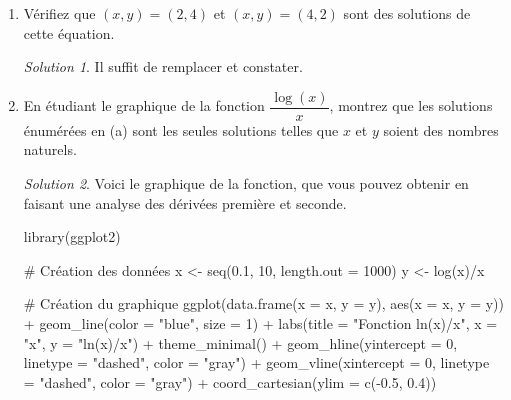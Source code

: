 \documentclass[
  12pt,
  letterpaper,
]{book}
\newenvironment{Shaded}{}{}
\newcommand{\AttributeTok}[1]{\textcolor[rgb]{0.84,0.23,0.29}{#1}}
\newcommand{\CommentTok}[1]{\textcolor[rgb]{0.42,0.45,0.49}{#1}}
\newcommand{\DecValTok}[1]{\textcolor[rgb]{0.00,0.36,0.77}{#1}}
\newcommand{\FloatTok}[1]{\textcolor[rgb]{0.00,0.36,0.77}{#1}}
\newcommand{\FunctionTok}[1]{\textcolor[rgb]{0.44,0.26,0.76}{#1}}
\newcommand{\NormalTok}[1]{\textcolor[rgb]{0.14,0.16,0.18}{#1}}
\newcommand{\OtherTok}[1]{\textcolor[rgb]{0.44,0.26,0.76}{#1}}
\newcommand{\SpecialCharTok}[1]{\textcolor[rgb]{0.00,0.36,0.77}{#1}}
\newcommand{\StringTok}[1]{\textcolor[rgb]{0.01,0.18,0.38}{#1}}
\theoremstyle{remark}
\newtheorem*{solution}{Solution}
\begin{document}
\begin{enumerate}
\item
  Vérifiez que \((x,y)=(2,4)\) et \((x,y)=(4,2)\) sont des solutions de
  cette équation.

  \begin{solution}

  Il suffit de remplacer et constater.

  \end{solution}
\item
  En étudiant le graphique de la fonction \(\dfrac{\log(x)}{x}\),
  montrez que les solutions énumérées en (a) sont les seules solutions
  telles que \(x\) et \(y\) soient des nombres naturels.

  \begin{solution}

  Voici le graphique de la fonction, que vous pouvez obtenir en faisant
  une analyse des dérivées première et seconde.

\begin{Shaded}
\begin{Highlighting}[]
\FunctionTok{library}\NormalTok{(ggplot2)}

\CommentTok{\# Création des données}
\NormalTok{x }\OtherTok{\textless{}{-}} \FunctionTok{seq}\NormalTok{(}\FloatTok{0.1}\NormalTok{, }\DecValTok{10}\NormalTok{, }\AttributeTok{length.out =} \DecValTok{1000}\NormalTok{)}
\NormalTok{y }\OtherTok{\textless{}{-}} \FunctionTok{log}\NormalTok{(x)}\SpecialCharTok{/}\NormalTok{x}

\CommentTok{\# Création du graphique}
\FunctionTok{ggplot}\NormalTok{(}\FunctionTok{data.frame}\NormalTok{(}\AttributeTok{x =}\NormalTok{ x, }\AttributeTok{y =}\NormalTok{ y), }\FunctionTok{aes}\NormalTok{(}\AttributeTok{x =}\NormalTok{ x, }\AttributeTok{y =}\NormalTok{ y)) }\SpecialCharTok{+}
  \FunctionTok{geom\_line}\NormalTok{(}\AttributeTok{color =} \StringTok{"blue"}\NormalTok{, }\AttributeTok{size =} \DecValTok{1}\NormalTok{) }\SpecialCharTok{+}
  \FunctionTok{labs}\NormalTok{(}\AttributeTok{title =} \StringTok{"Fonction ln(x)/x"}\NormalTok{,}
       \AttributeTok{x =} \StringTok{"x"}\NormalTok{,}
       \AttributeTok{y =} \StringTok{"ln(x)/x"}\NormalTok{) }\SpecialCharTok{+}
  \FunctionTok{theme\_minimal}\NormalTok{() }\SpecialCharTok{+}
  \FunctionTok{geom\_hline}\NormalTok{(}\AttributeTok{yintercept =} \DecValTok{0}\NormalTok{, }\AttributeTok{linetype =} \StringTok{"dashed"}\NormalTok{, }\AttributeTok{color =} \StringTok{"gray"}\NormalTok{) }\SpecialCharTok{+}
  \FunctionTok{geom\_vline}\NormalTok{(}\AttributeTok{xintercept =} \DecValTok{0}\NormalTok{, }\AttributeTok{linetype =} \StringTok{"dashed"}\NormalTok{, }\AttributeTok{color =} \StringTok{"gray"}\NormalTok{) }\SpecialCharTok{+}
  \FunctionTok{coord\_cartesian}\NormalTok{(}\AttributeTok{ylim =} \FunctionTok{c}\NormalTok{(}\SpecialCharTok{{-}}\FloatTok{0.5}\NormalTok{, }\FloatTok{0.4}\NormalTok{))}
\end{Highlighting}
\end{Shaded}


\end{solution}
\end{enumerate}
\end{document}
